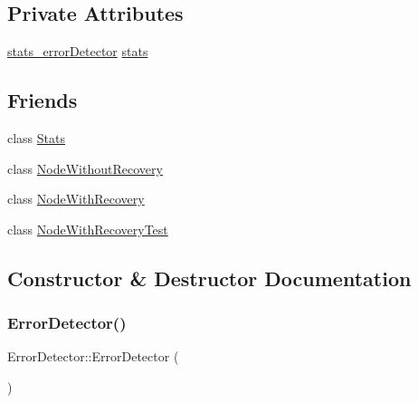 \subsection*{Private Attributes}
\begin{DoxyCompactItemize}
\item 
\hyperlink{_error_detector_8h_abbc922e22c7b55f0bd58bea618eec587}{stats\+\_\+error\+Detector} \hyperlink{class_error_detector_acb550f19c1da2d61d40757351f96d4b1}{stats}
\end{DoxyCompactItemize}
\subsection*{Friends}
\begin{DoxyCompactItemize}
\item 
class \hyperlink{class_error_detector_a129f65b6976377739eb6231b6962985e}{Stats}
\item 
class \hyperlink{class_error_detector_aa0495b79e94b09962892b921ae370e57}{Node\+Without\+Recovery}
\item 
class \hyperlink{class_error_detector_af62fbc8632478613aa92b0e55c79510e}{Node\+With\+Recovery}
\item 
class \hyperlink{class_error_detector_a4a759c82473f06c7e89c3d75a509a390}{Node\+With\+Recovery\+Test}
\end{DoxyCompactItemize}


\subsection{Constructor \& Destructor Documentation}
\mbox{\label{class_error_detector_ae851a02dff242968cd6419400271d74f}} 
\subsubsection{\texorpdfstring{Error\+Detector()}{ErrorDetector()}}
{\footnotesize\ttfamily Error\+Detector\+::\+Error\+Detector (\begin{DoxyParamCaption}{ }\end{DoxyParamCaption})}

\mbox{\label{class_error_detector_a3708d713f8f7bee01aa7e5a2fb7bb652}} 
